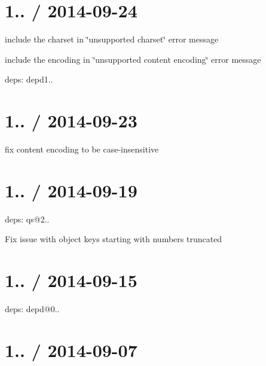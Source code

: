 \section*{1.. / 2014-\/09-\/24 }


\begin{DoxyItemize}
\item include the charset in \char`\"{}unsupported charset\char`\"{} error message
\item include the encoding in \char`\"{}unsupported content encoding\char`\"{} error message
\item deps\+: depd1..
\end{DoxyItemize}

\section*{1.. / 2014-\/09-\/23 }


\begin{DoxyItemize}
\item fix content encoding to be case-\/insensitive
\end{DoxyItemize}

\section*{1.. / 2014-\/09-\/19 }


\begin{DoxyItemize}
\item deps\+: qs@2..
\begin{DoxyItemize}
\item Fix issue with object keys starting with numbers truncated
\end{DoxyItemize}
\end{DoxyItemize}

\section*{1.. / 2014-\/09-\/15 }


\begin{DoxyItemize}
\item deps\+: depd@0..
\end{DoxyItemize}

\section*{1.. / 2014-\/09-\/07 }


